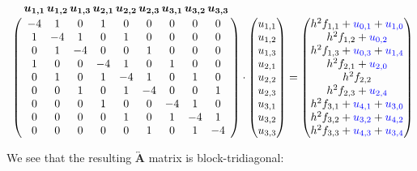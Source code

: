\documentclass[11pt]{report}
\begin{document}
\begin{equation*}
\let\quad\thinspace
\bordermatrix{\text{}& \bm{u_{1,1}} & \bm{u_{1,2}} & \bm{u_{1,3}} & \bm{u_{2,1}} & \bm{u_{2,2}} & \bm{u_{2,3}} & \bm{u_{3,1}} & \bm{u_{3,2}} & \bm{u_{3,3}} \cr
   & -4 & 1 & 0 & 1 & 0 & 0 & 0 & 0 & 0  \cr
   & 1 & -4 & 1 & 0 & 1 & 0 & 0 & 0 & 0  \cr
   & 0 & 1 & -4 & 0 & 0 & 1 & 0 & 0 & 0  \cr 
   & 1 & 0 & 0 & -4 & 1 & 0 & 1 & 0 & 0  \cr
   & 0 & 1 & 0 & 1 & -4 & 1 & 0 & 1 & 0  \cr
   & 0 & 0 & 1 & 0 & 1 & -4 & 0 & 0 & 1  \cr
   & 0 & 0 & 0 & 1 & 0 & 0 & -4 & 1 & 0  \cr
   & 0 & 0 & 0 & 0 & 1 & 0 & 1 & -4 & 1  \cr
   & 0 & 0 & 0 & 0 & 0 & 1 & 0 & 1 & -4 
    }
\cdot
\begin{pmatrix}
u_{1,1} \\ u_{1,2} \\ u_{1,3} \\ u_{2,1} \\ u_{2,2} \\ u_{2,3} \\ u_{3,1} \\ u_{3,2} \\ u_{3,3}
\end{pmatrix}
=
\begin{pmatrix}
h^2f_{1,1} + \textcolor{blue}{u_{0,1}} + \textcolor{blue}{u_{1,0}} \\ 
h^2f_{1,2} + \textcolor{blue}{u_{0,2}} \\ 
h^2f_{1,3} + \textcolor{blue}{u_{0,3}} + \textcolor{blue}{u_{1,4}} \\
h^2f_{2,1} + \textcolor{blue}{u_{2,0}} \\
h^2f_{2,2} \\
h^2f_{2,3} + \textcolor{blue}{u_{2,4}} \\
h^2f_{3,1} + \textcolor{blue}{u_{4,1}} + \textcolor{blue}{u_{3,0}} \\
h^2f_{3,2} + \textcolor{blue}{u_{3,2}} + \textcolor{blue}{u_{4,2}} \\
h^2f_{3,3} + \textcolor{blue}{u_{4,3}} + \textcolor{blue}{u_{3,4}}
\end{pmatrix}
\end{equation*}
\vspace{0.75cm}

We see that the resulting $\overleftrightarrow{\textbf{A}}$ matrix is block-tridiagonal:
\end{document}
